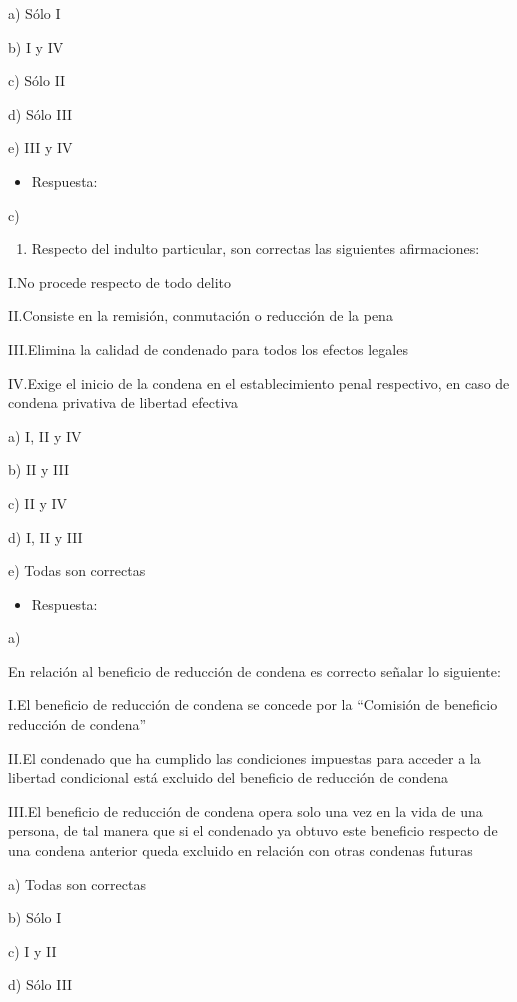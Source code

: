 \documentclass[letterpaper, 11pt]{article}
\begin{document}
a) Sólo I

b) I y IV

c) Sólo II

d) Sólo III

e) III y IV

\begin{itemize}
\item Respuesta:
\end{itemize}
c)


\begin{enumerate}
\item Respecto del indulto particular, son correctas las siguientes afirmaciones:
\end{enumerate}

I.No procede respecto de todo delito

II.Consiste en la remisión, conmutación o reducción de la pena

III.Elimina la calidad de condenado para todos los efectos legales

IV.Exige el inicio de la condena en el establecimiento penal respectivo, en caso de
condena privativa de libertad efectiva

a) I, II y IV

b) II y III

c) II y IV

d) I, II y III

e) Todas son correctas

\begin{itemize}
\item Respuesta:
\end{itemize}
a)


En relación al beneficio de reducción de condena es correcto señalar lo
siguiente:

I.El beneficio de reducción de condena se concede por la “Comisión de beneficio
reducción de condena”

II.El condenado que ha cumplido las condiciones impuestas para acceder a la libertad
condicional está excluido del beneficio de reducción de condena

III.El beneficio de reducción de condena opera solo una vez en la vida de una
persona, de tal manera que si el condenado ya obtuvo este beneficio respecto de
una condena anterior queda excluido en relación con otras condenas futuras

a) Todas son correctas

b) Sólo I

c) I y II

d) Sólo III
\end{document}
